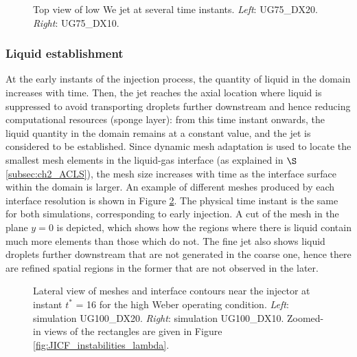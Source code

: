 \clearpage

\begin{figure}[ht]
\centering
{}
\caption[Top view of low We jet at several time instants. ]{Top view of low We jet at several time instants. \textsl{Left}: UG75\_DX20. \textsl{Right}: UG75\_DX10.}
\label{fig:JICF_establishment_UG75_top}
\end{figure}

\clearpage

\subsubsection*{Liquid establishment}

At the early instants of the injection process, the quantity of liquid in the domain increases with time. Then, the jet reaches the axial location where liquid is suppressed to avoid transporting droplets further downstream and hence reducing computational resources (sponge layer): from this time instant onwards, the liquid quantity in the domain remains at a constant value, and the jet is considered to be established. Since dynamic mesh adaptation is used to locate the smallest mesh elements in the liquid-gas interface (as explained in $\S$\ref{subsec:ch2_ACLS}), the mesh size increases with time as the interface surface within the domain is larger. An example of different meshes produced by each interface resolution is shown in Figure \ref{fig:JICF_w_mesh}. The physical time instant is the same for both simulations, corresponding to early injection. A cut of the mesh in the plane $y = 0$ is depicted, which shows how the regions where there is liquid contain much more elements than those which do not. The fine jet also shows liquid droplets further downstream that are not generated in the coarse one, hence there are refined spatial regions in the former that are not observed in the later.




\begin{figure}[ht]
\centering
	\centering
\caption[Lateral view of meshes and interface contours near the injector at instant $t^{*}$ = 16 for the high Weber operating condition.]{Lateral view of meshes and interface contours near the injector at instant $t^{*}$ = 16 for the high Weber operating condition. \textsl{Left}: simulation UG100\_DX20. \textsl{Right}: simulation UG100\_DX10. Zoomed-in views of the rectangles are given in Figure \ref{fig:JICF_instabilities_lambda}.}
\label{fig:JICF_w_mesh}
\end{figure}

